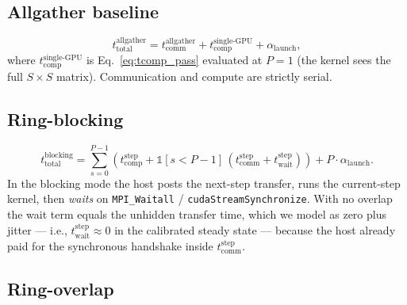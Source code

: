 \documentclass[11pt]{article}
\newcommand{\comp}{\mathrm{comp}}
\newcommand{\comm}{\mathrm{comm}}
\newcommand{\wait}{\mathrm{wait}}
\newcommand{\tot}{\mathrm{total}}
\newcommand{\step}{\mathrm{step}}
\newcommand{\indicator}[1]{\mathbb{1}\!\left[#1\right]}
\begin{document}
\subsection{Allgather baseline}

\begin{equation}
  t_\tot^{\text{allgather}}
  = t_\comm^{\text{allgather}}
    + t_\comp^{\text{single-GPU}}
    + \alpha_{\text{launch}} ,
  \label{eq:tot_allgather}
\end{equation}
where $t_\comp^{\text{single-GPU}}$ is Eq.~\eqref{eq:tcomp_pass}
evaluated at $P=1$ (the kernel sees the full $S \times S$ matrix).
Communication and compute are strictly serial.

\subsection{Ring-blocking}

\begin{equation}
  t_\tot^{\text{blocking}}
  = \sum_{s=0}^{P-1} \left(
      t_\comp^\step
      + \indicator{s < P-1}\,(t_\comm^\step + t_\wait^\step)
    \right)
    + P \cdot \alpha_{\text{launch}} .
  \label{eq:tot_blocking}
\end{equation}
In the blocking mode the host posts the next-step transfer, runs the
current-step kernel, then \emph{waits} on \texttt{MPI\_Waitall} /
\texttt{cudaStreamSynchronize}. With no overlap the wait term equals
the unhidden transfer time, which we model as zero plus jitter ---
i.e., $t_\wait^\step \approx 0$ in the calibrated steady state ---
because the host already paid for the synchronous handshake inside
$t_\comm^\step$.

\subsection{Ring-overlap}
\end{document}
